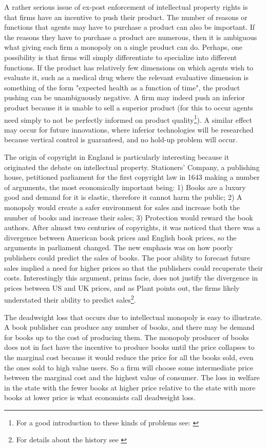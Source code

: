 A rather serious issue of ex-post enforcement of intellectual property rights is that firms have an incentive to push their product. The number of reasons or functions that agents may have to purchase a product can also be important. If the reasons they have to purchase a product are numerous, then it is ambiguous what giving each firm a monopoly on a single product can do. Perhaps, one possibility is that firms will simply differentiate to specialize into different functions. If the product has relatively few dimensions on which agents wish to evaluate it, such as a medical drug where the relevant evaluative dimension is something of the form "expected health as a function of time", the product pushing can be unambiguously negative. A firm may indeed push an inferior product because it is unable to sell a superior product (for this to occur agents need simply to not be perfectly informed on product quality\footnote{For a good introduction to these kinds of problems see: \cite{spiegler2011bounded} }). A similar effect may occur for future innovations, where inferior technologies will be researched because vertical control is guaranteed, and no hold-up problem will occur.

The origin of copyright in England is particularly interesting because it originated the debate on intellectual property. Stationers' Company, a publishing house, petitioned parliament for the first copyright law in 1643 making a number of arguments, the most economically important being: 1) Books are a luxury good and demand for it is elastic, therefore it cannot harm the public; 2) A monopoly would create a safer environment for sales and increase both the number of books and increase their sales; 3) Protection would reward the book authors. After almost two centuries of copyrights, it was noticed that there was a divergence between American book prices and English book prices, so the arguments in parliament changed. The new emphasis was on how poorly publishers could predict the sales of books. The poor ability to forecast future sales implied a need for higher prices so that the publishers could recuperate their costs. Interestingly this argument, prima facie, does  not justify the divergence in prices between US and UK prices, and as Plant points out, the firms likely understated their ability to predict sales\footnote{For details about the history see \cite{Plant1934}}.

The deadweight loss that occurs due to intellectual monopoly is easy to illustrate. A book publisher can produce any number of books, and there may be demand for books up to the cost of producing them. The monopoly producer of books does not in fact have the incentive to produce books until the price collapses to the marginal cost because it would reduce the price for all the books sold, even the ones sold to high value users. So a firm will choose some intermediate price between the marginal cost and the highest value of consumer. The loss in welfare in the state with the fewer books at higher price relative to the state with more books at lower price is what economists call deadweight loss. 

